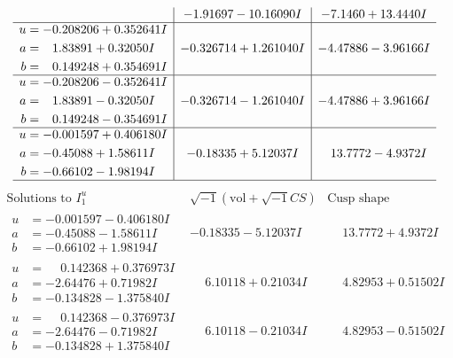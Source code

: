 \documentclass[1p]{elsarticle_modified}
\theoremstyle{definition}
\newcommand{\I}{\sqrt{-1}}
\begin{document}
$$\begin{array}{c|c|c}
 & -1.91697 - 10.16090 I & -7.1460 + 13.4440 I \\ \hline\begin{aligned}
u &= -0.208206 + 0.352641 I \\
a &= \phantom{-}1.83891 + 0.32050 I \\
b &= \phantom{-}0.149248 + 0.354691 I\end{aligned}
 & -0.326714 + 1.261040 I & -4.47886 - 3.96166 I \\ \hline\begin{aligned}
u &= -0.208206 - 0.352641 I \\
a &= \phantom{-}1.83891 - 0.32050 I \\
b &= \phantom{-}0.149248 - 0.354691 I\end{aligned}
 & -0.326714 - 1.261040 I & -4.47886 + 3.96166 I \\ \hline\begin{aligned}
u &= -0.001597 + 0.406180 I \\
a &= -0.45088 + 1.58611 I \\
b &= -0.66102 - 1.98194 I\end{aligned}
 & -0.18335 + 5.12037 I & \phantom{-}13.7772 - 4.9372 I\\
 \hline 
 \end{array}$$\newpage$$\begin{array}{c|c|c}  
\text{Solutions to }I^u_{1}& \I (\text{vol} + \sqrt{-1}CS) & \text{Cusp shape}\\
 \hline 
\begin{aligned}
u &= -0.001597 - 0.406180 I \\
a &= -0.45088 - 1.58611 I \\
b &= -0.66102 + 1.98194 I\end{aligned}
 & -0.18335 - 5.12037 I & \phantom{-}13.7772 + 4.9372 I \\ \hline\begin{aligned}
u &= \phantom{-}0.142368 + 0.376973 I \\
a &= -2.64476 + 0.71982 I \\
b &= -0.134828 - 1.375840 I\end{aligned}
 & \phantom{-}6.10118 + 0.21034 I & \phantom{-}4.82953 + 0.51502 I \\ \hline\begin{aligned}
u &= \phantom{-}0.142368 - 0.376973 I \\
a &= -2.64476 - 0.71982 I \\
b &= -0.134828 + 1.375840 I\end{aligned}
 & \phantom{-}6.10118 - 0.21034 I & \phantom{-}4.82953 - 0.51502 I \\ \hline\begin{aligned}

\end{aligned}
\end{array}$$
\end{document}
